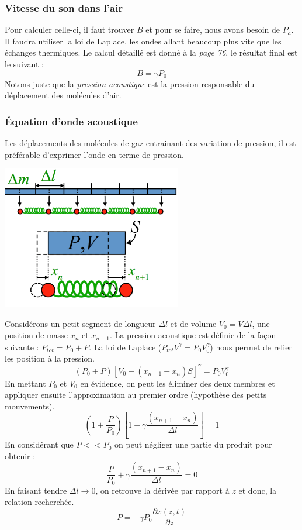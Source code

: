 \documentclass	[11pt, a4paper, openany]{book}
\begin{document}
\subsubsection{Vitesse du son dans l'air}
Pour calculer celle-ci, il faut trouver $B$ et pour se faire, nous avons besoin de $P_a$. Il faudra utiliser la loi de Laplace, les ondes allant beaucoup plus vite que les échanges thermiques. Le calcul détaillé est donné à la \textit{page 76}, le résultat final est le suivant :
\begin{equation}
B = \gamma P_0
\end{equation}
Notons juste que la \textit{pression acoustique} est la pression responsable du déplacement des molécules d'air.

\subsubsection{Équation d'onde acoustique}
Les déplacements des molécules de gaz entrainant des variation de pression, il est préférable d'exprimer l'onde en terme de pression.
\begin{center}
\includegraphics[scale=0.4]{oo/image29.png}
\end{center}
Considérons un petit segment de longueur $\Delta l$ et de volume $V_0 = V\Delta l$, une position de masse $x_n$ et $x_{n+1}$.  La pression acoustique est définie de la façon suivante : $P_{tot} = P_0 + P$. La loi de Laplace ($P_{tot}V^\gamma = P_0V_0^\gamma$) nous permet de relier les position à la pression.
\begin{equation}
(P_0 + P)\left[V_0 + (x_{n+1} - x_n)S\right]^\gamma = P_0V_0^\gamma
\end{equation}
En mettant $P_0$ et $V_0$ en évidence, on peut les éliminer des deux membres et appliquer ensuite l'approximation au premier ordre (hypothèse des petits mouvements).
\begin{equation}
\left(1 + \frac{P}{P_0}\right)\left[1 + \gamma\frac{(x_{n+1} - x_n)}{\Delta l}\right] = 1
\end{equation}
En considérant que $P << P_0$ on peut négliger une partie du produit pour obtenir :
\begin{equation}
\frac{P}{P_0} + \gamma\frac{(x_{n+1} - x_n)}{\Delta l} = 0
\end{equation}
En faisant tendre $\Delta l \rightarrow 0$, on retrouve la dérivée par rapport à $z$ et donc, la relation recherchée.
\begin{equation}
P = -\gamma P_0\frac{\partial x(z, t)}{\partial z}
\end{equation}
\end{document}

